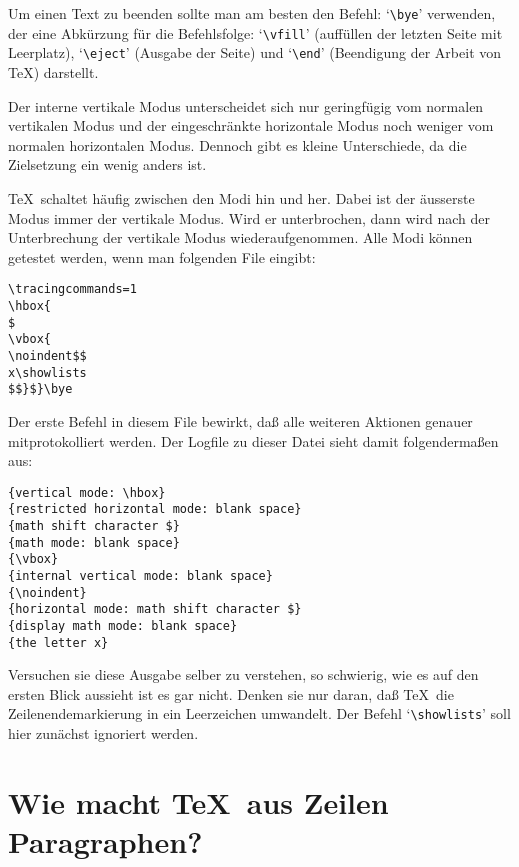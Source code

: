Um einen Text zu beenden sollte man am besten den Befehl:
`\verb|\bye|'
verwenden, der eine 
Abk\"urzung f\"ur die Befehlsfolge: 
`\verb|\vfill|'
(auff\"ullen der letzten Seite mit Leerplatz),
`\verb|\eject|'
(Ausgabe
der Seite) und `\verb|\end|' (Beendigung der Arbeit von \TeX)
darstellt.

Der interne vertikale Modus unterscheidet sich nur geringf\"ugig vom
normalen vertikalen Modus und der eingeschr\"ankte
horizontale Modus
noch weniger vom normalen horizontalen Modus. Dennoch gibt es kleine
Unterschiede, da die Zielsetzung ein wenig anders ist.

\TeX\ schaltet h\"aufig zwischen den Modi hin und her. Dabei ist der
\"ausserste Modus immer der vertikale Modus. Wird er unterbrochen, dann
wird nach der Unterbrechung der vertikale Modus wiederaufgenommen.
Alle Modi k\"onnen getestet werden, wenn man folgenden 
File eingibt:
\begin{verbatim}
\tracingcommands=1
\hbox{
$
\vbox{
\noindent$$
x\showlists
$$}$}\bye
\end{verbatim}
Der erste Befehl in diesem File bewirkt, da\ss{} alle weiteren Aktionen
genauer mitprotokolliert werden. Der Logfile zu dieser Datei sieht
damit folgenderma\ss{}en aus:
\begin{verbatim}
{vertical mode: \hbox}
{restricted horizontal mode: blank space}
{math shift character $}
{math mode: blank space}
{\vbox}
{internal vertical mode: blank space}
{\noindent}
{horizontal mode: math shift character $}
{display math mode: blank space}
{the letter x}
\end{verbatim}
Versuchen sie diese 
Ausgabe selber zu verstehen, so schwierig, wie es
auf den ersten Blick aussieht ist es gar nicht. Denken sie nur daran,
da\ss{} \TeX\ die 
Zeilenendemarkierung in ein 
Leerzeichen umwandelt. Der
Befehl `\verb|\showlists|' soll hier zun\"achst ignoriert werden.

\section{Wie macht \TeX\ aus Zeilen Paragraphen?}
